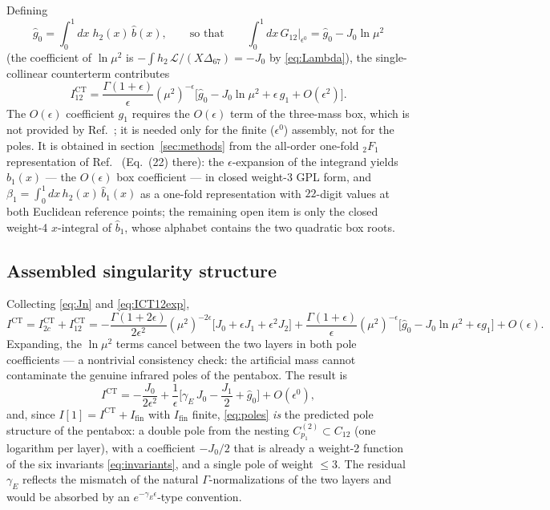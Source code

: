\documentclass[11pt]{article}
\newcommand{\eps}{\epsilon}
\newcommand{\CT}{\mathrm{CT}}
\newcommand{\fin}{\mathrm{fin}}
\begin{document}
Defining
\begin{equation}
\hat g_0=\int_0^1 dx\;h_2(x)\,\hat b(x),
\qquad\text{so that}\qquad
\int_0^1dx\,G_{12}\Big|_{\eps^0}=\hat g_0-J_0\ln\mu^{2}
\end{equation}
(the coefficient of $\ln\mu^2$ is $-\int h_2\,\mathcal{L}/(X\Delta_{67})=-J_0$ by
\eqref{eq:Lambda}), the single-collinear counterterm contributes
\begin{equation}
I^{\CT}_{12}
=\frac{\Gamma(1+\eps)}{\eps}(\mu^{2})^{-\eps}
\Big[\hat g_0-J_0\ln\mu^{2}+\eps\,g_1+O(\eps^{2})\Big] .
\label{eq:ICT12exp}
\end{equation}
The $O(\eps)$ coefficient $g_1$ requires the $O(\eps)$ term of the three-mass box, which is not
provided by Ref.~\cite{EZ}; it is needed only for the finite ($\eps^0$) assembly, not for the
poles. It is obtained in section~\ref{sec:methods} from the all-order one-fold
${}_2F_1$ representation of Ref.~\cite{DN} (Eq.~(22) there): the $\eps$-expansion of the
integrand yields $\hat b_1(x)$ --- the $O(\eps)$ box coefficient --- in closed weight-3 GPL form,
and $\beta_1=\int_0^1 dx\,h_2(x)\,\hat b_1(x)$ as a one-fold representation with $22$-digit
values at both Euclidean reference points; the remaining open item is only the closed weight-4
$x$-integral of $\hat b_1$, whose alphabet contains the two quadratic box roots.

\subsection{Assembled singularity structure}
\label{sec:assembly}

Collecting \eqref{eq:Jn} and \eqref{eq:ICT12exp},
\begin{equation}
I^{\CT}=I^{\CT}_{2c}+I^{\CT}_{12}
=-\frac{\Gamma(1+2\eps)}{2\eps^{2}}(\mu^{2})^{-2\eps}
\big[J_{0}+\eps J_{1}+\eps^{2}J_{2}\big]
+\frac{\Gamma(1+\eps)}{\eps}(\mu^{2})^{-\eps}
\big[\hat g_0-J_0\ln\mu^2+\eps g_{1}\big]+O(\eps) .
\end{equation}
Expanding, the $\ln\mu^2$ terms cancel between the two layers in both pole coefficients --- a
nontrivial consistency check: the artificial mass cannot contaminate the genuine infrared poles of
the pentabox. The result is
\begin{equation}
\boxed{\;
I^{\CT}
=-\frac{J_{0}}{2\eps^{2}}
+\frac{1}{\eps}\Big[\gamma_E\,J_{0}-\frac{J_{1}}{2}+\hat g_{0}\Big]
+O(\eps^{0}) ,\;}
\label{eq:poles}
\end{equation}
and, since $I[1]=I^{\CT}+I_{\fin}$ with $I_{\fin}$ finite, \eqref{eq:poles} \emph{is} the
predicted pole structure of the pentabox: a double pole from the nesting
$C^{(2)}_{p_1}\subset C_{12}$ (one logarithm per layer), with a coefficient $-J_0/2$ that is
already a weight-2 function of the six invariants \eqref{eq:invariants}, and a single pole of
weight $\le3$. The residual $\gamma_E$ reflects the mismatch of the natural $\Gamma$-normalizations
of the two layers and would be absorbed by an $e^{-\gamma_E\eps}$-type convention.
\end{document}
